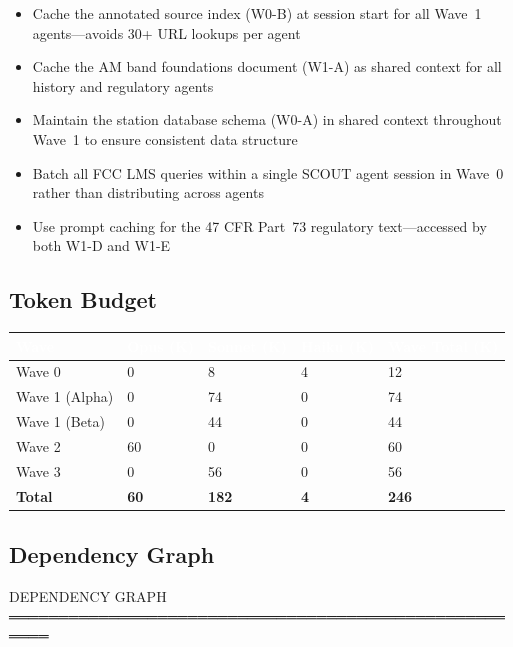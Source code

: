 \documentclass[11pt,letterpaper]{article}
\newcommand{\tableheader}[1]{\textbf{\sffamily\textcolor{white}{#1}}}
\begin{document}
\begin{asciibox}
\begin{itemize}[leftmargin=*]
  \item Cache the annotated source index (W0-B) at session start for all Wave~1 agents---avoids 30+ URL lookups per agent
  \item Cache the AM band foundations document (W1-A) as shared context for all history and regulatory agents
  \item Maintain the station database schema (W0-A) in shared context throughout Wave~1 to ensure consistent data structure
  \item Batch all FCC LMS queries within a single SCOUT agent session in Wave~0 rather than distributing across agents
  \item Use prompt caching for the 47 CFR Part~73 regulatory text---accessed by both W1-D and W1-E
\end{itemize}

\subsection{Token Budget}

\begin{center}
\begin{tabularx}{\textwidth}{L{3cm}C{2cm}C{2cm}C{2cm}C{3cm}}
\toprule
{}
\tableheader{Wave} & \tableheader{Opus (K)} & \tableheader{Sonnet (K)} & \tableheader{Haiku (K)} & \tableheader{Wave Total (K)} \\
\midrule
Wave 0 & 0 & 8 & 4 & 12 \\
Wave 1 (Alpha) & 0 & 74 & 0 & 74 \\
Wave 1 (Beta) & 0 & 44 & 0 & 44 \\
Wave 2 & 60 & 0 & 0 & 60 \\
Wave 3 & 0 & 56 & 0 & 56 \\
\textbf{Total} & \textbf{60} & \textbf{182} & \textbf{4} & \textbf{246} \\
\bottomrule
\end{tabularx}
\end{center}

\subsection{Dependency Graph}

\begin{asciibox}
DEPENDENCY GRAPH
══════════════════════════════════════════════════════


\end{asciibox}
\end{asciibox}
\end{document}

